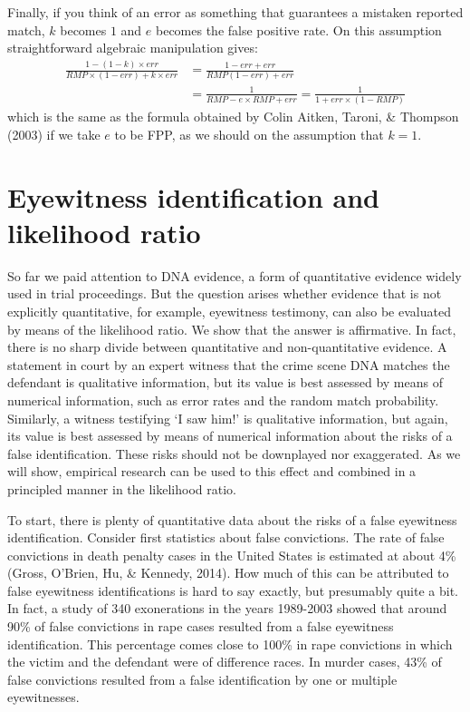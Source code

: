 \documentclass[
  10pt,
  dvipsnames,enabledeprecatedfontcommands]{scrartcl}
\begin{document}

Finally, if you think of an error as something that guarantees a
mistaken reported match, \(k\) becomes \(1\) and \(e\) becomes the false
positive rate. On this assumption straightforward algebraic manipulation
gives: \begin{align*}
 \frac{1 - (1-k)\times err}{RMP\times (1-err)+k\times err} & = \frac{1-err+err}{RMP(1-err)+err}\\
 & = \frac{1}{RMP - e\times RMP + err} = \frac{1}{1 + err\times(1-RMP)}
\end{align*} \noindent which is the same as the formula obtained by
Colin Aitken, Taroni, \& Thompson (2003) if we take \(e\) to be FPP, as
we should on the assumption that \(k=1\).

\hypertarget{eyewitness-identification-and-likelihood-ratio}{%
\section{\texorpdfstring{Eyewitness identification and likelihood ratio
\label{sec:eyewitness}}{Eyewitness identification and likelihood ratio }}\label{eyewitness-identification-and-likelihood-ratio}}

So far we paid attention to DNA evidence, a form of quantitative
evidence widely used in trial proceedings. But the question arises
whether evidence that is not explicitly quantitative, for example,
eyewitness testimony, can also be evaluated by means of the likelihood
ratio. We show that the answer is affirmative. In fact, there is no
sharp divide between quantitative and non-quantitative evidence. A
statement in court by an expert witness that the crime scene DNA matches
the defendant is qualitative information, but its value is best assessed
by means of numerical information, such as error rates and the random
match probability. Similarly, a witness testifying `I saw him!' is
qualitative information, but again, its value is best assessed by means
of numerical information about the risks of a false identification.
These risks should not be downplayed nor exaggerated. As we will show,
empirical research can be used to this effect and combined in a
principled manner in the likelihood ratio.

To start, there is plenty of quantitative data about the risks of a
false eyewitness identification. Consider first statistics about false
convictions. The rate of false convictions in death penalty cases in the
United States is estimated at about 4\% (Gross, O'Brien, Hu, \& Kennedy,
2014). How much of this can be attributed to false eyewitness
identifications is hard to say exactly, but presumably quite a bit. In
fact, a study of 340 exonerations in the years 1989-2003 showed that
around 90\% of false convictions in rape cases resulted from a false
eyewitness identification. This percentage comes close to 100\% in rape
convictions in which the victim and the defendant were of difference
races. In murder cases, 43\% of false convictions resulted from a false
identification by one or multiple eyewitnesses. 
\end{document}
